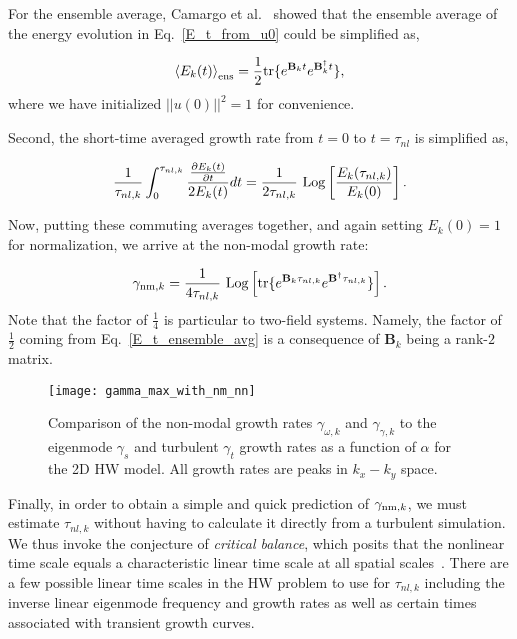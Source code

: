 \documentclass[twocolumn,showkeys,superscriptaddress]{revtex4}
\def\beq{\begin{equation}}
\def\eeq{\end{equation}}
\newcommand{\pdiff}[2]{\frac{\partial#1}{\partial#2}}
\begin{document}
For the ensemble average, Camargo et al.~\cite{camargo1998,friedman2014} showed that the ensemble average of the energy evolution in Eq.~\ref{E_t_from_u0} could be simplified as,

\beq
\label{E_t_ensemble_avg}
\left< E_k(t) \right>_{{\rm{ens}}} = \frac{1}{2} {\rm{tr}} \{ e^{\mathbf{B}_k t} e^{\mathbf{B}_k^{\dagger}t} \},
\eeq
where we have initialized $||u(0)||^2 = 1$ for convenience.

Second, the short-time averaged growth rate from $t=0$ to $t = \tau_{nl}$ is simplified as,

\beq
\label{gamma_nm_calc}
\frac{1}{\tau_{nl,k}} \int_0^{\tau_{nl,k}} \frac{\pdiff{E_k(t)}{t}}{2 E_k(t)} dt = \frac{1}{2 \tau_{nl,k}} \ {\rm{Log}} \left[ \frac{E_k(\tau_{nl,k})}{E_k(0)}\right].
\eeq

Now, putting these commuting averages together, and again setting $E_k(0) = 1$ for normalization, we arrive at the non-modal growth rate:

\beq
\label{gamma_nm}
\gamma_{{\rm{nm}},k} = \frac{1}{4 \tau_{nl,k}} \ {\rm{Log}} \left[ {\rm{tr}} \{ e^{\mathbf{B}_k \tau_{nl,k}} e^{\mathbf{B}^{\dagger} \tau_{nl,k}} \} \right].
\eeq
Note that the factor of $\frac{1}{4}$ is particular to two-field systems. Namely, the factor of $\frac{1}{2}$ coming from Eq.~\ref{E_t_ensemble_avg} is a consequence of $\mathbf{B}_k$ being a rank-$2$ matrix.

\begin{figure}
\centerline{\texttt{[image: gamma\_max\_with\_nm\_nn]}}
\caption{Comparison of the non-modal growth rates $\gamma_{\omega,k}$ and $\gamma_{\gamma,k}$ to the eigenmode $\gamma_{s}$ and turbulent $\gamma_{t}$ growth rates as a function of $\alpha$ for the 2D HW model. 
All growth rates are peaks in $k_x-k_y$ space.}
\label{gamma_max_with_nm}
\end{figure}

Finally, in order to obtain a simple and quick prediction of $\gamma_{{\rm{nm}},k}$, we must estimate $\tau_{nl,k}$ without having to calculate it directly from a turbulent simulation. 
We thus invoke the conjecture of \emph{critical balance}, which posits that the nonlinear time scale equals a characteristic linear time scale at all spatial scales~\cite{schekochihin2012}. 
There are a few possible linear time scales in the HW problem to use for $\tau_{nl,k}$ 
including the inverse linear eigenmode frequency and growth rates as well as certain times associated with transient growth curves.
\end{document}
